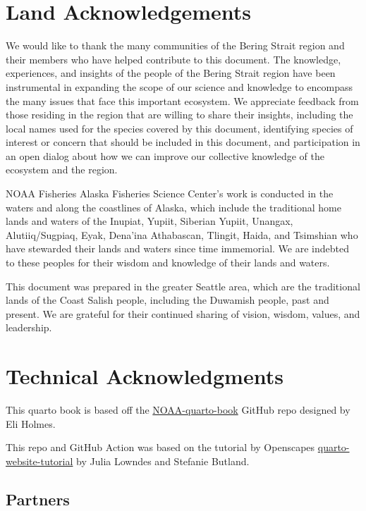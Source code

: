 \documentclass[
  letterpaper,
  oneside,
  open=any]{scrbook}
\begin{document}
\hypertarget{land-acknowledgements}{%
\chapter{Land Acknowledgements}\label{land-acknowledgements}}

We would like to thank the many communities of the Bering Strait region
and their members who have helped contribute to this document. The
knowledge, experiences, and insights of the people of the Bering Strait
region have been instrumental in expanding the scope of our science and
knowledge to encompass the many issues that face this important
ecosystem. We appreciate feedback from those residing in the region that
are willing to share their insights, including the local names used for
the species covered by this document, identifying species of interest or
concern that should be included in this document, and participation in
an open dialog about how we can improve our collective knowledge of the
ecosystem and the region.

NOAA Fisheries Alaska Fisheries Science Center's work is conducted in
the waters and along the coastlines of Alaska, which include the
traditional home lands and waters of the Inupiat, Yupiit, Siberian
Yupiit, Unangax, Alutiiq/Sugpiaq, Eyak, Dena'ina Athabascan, Tlingit,
Haida, and Tsimshian who have stewarded their lands and waters since
time immemorial. We are indebted to these peoples for their wisdom and
knowledge of their lands and waters.

This document was prepared in the greater Seattle area, which are the
traditional lands of the Coast Salish people, including the Duwamish
people, past and present. We are grateful for their continued sharing of
vision, wisdom, values, and leadership.

\hypertarget{technical-acknowledgments}{%
\chapter{Technical Acknowledgments}\label{technical-acknowledgments}}

This quarto book is based off the
\href{https://github.com/nmfs-opensci/NOAA-quarto-book}{NOAA-quarto-book}
GitHub repo designed by Eli Holmes.

This repo and GitHub Action was based on the tutorial by Openscapes
\href{https://github.com/Openscapes/quarto-website-tutorial}{quarto-website-tutorial}
by Julia Lowndes and Stefanie Butland.

\hypertarget{partners}{%
\section{Partners}\label{partners}}
\end{document}
